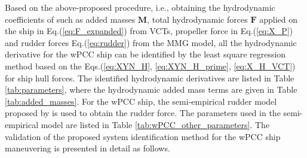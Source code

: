 \noindent Based on the above-proposed procedure, i.e., obtaining the hydrodynamic coefficients of such as added masses $\boldsymbol{M}$, total hydrodynamic forces $\boldsymbol{F}$ applied on the ship in Eq.(\ref{eq:F_expanded}) from VCTs, propeller force in Eq.(\ref{eq:X_P}) and rudder forces Eq.(\ref{eq:rudder}) from the MMG model, all the hydrodynamic derivative for the wPCC ship can be identified by the least square regression method based on the Eqs.(\ref{eq:XYN_H}, \ref{eq:XYN_H_prime}, \ref{eq:X_H_VCT}) for ship hull forces. The identified hydrodynamic derivatives are listed in Table \ref{tab:parameters}, where the hydrodynamic added mass terms are given in Table \ref{tab:added_masses}. For the wPCC ship, the semi-empirical rudder model proposed by \cite{alexanderssonSystemIdentificationPhysicsinformed2024b} is used to obtain the rudder force. The parameters used in the semi-empirical model are listed in Table \ref{tab:wPCC_other_parameters}. The validation of the proposed system identification method for the wPCC ship maneuvering is presented in detail as follows.